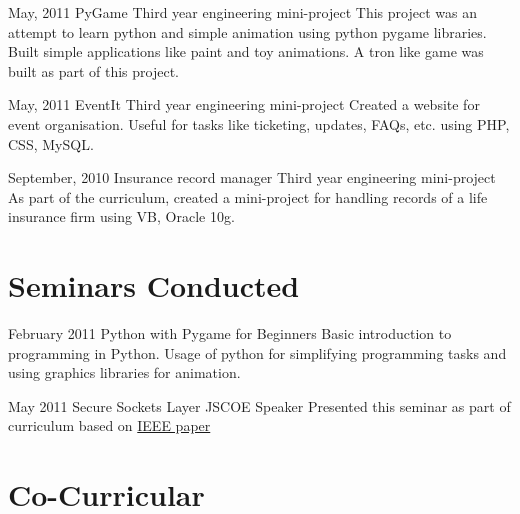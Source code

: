 \documentclass[11pt,a4paper]{moderncv}
\begin{document}
\cventry
{May, 2011}
{PyGame}
{Third year engineering mini-project}
{}
{}
{This project was an attempt to learn python and simple animation using python pygame libraries. Built simple applications like paint and toy 
animations. A tron like game was built as part of this project. }

\cventry
{May, 2011}
{EventIt}
{Third year engineering mini-project}
{}
{}
{Created a website for event organisation. Useful for tasks like ticketing, updates, FAQs, etc. using PHP, CSS, MySQL. }

\cventry
{September, 2010}
{Insurance record manager}
{Third year engineering mini-project}
{}
{}
{As part of the curriculum, created a mini-project for handling records of a life insurance firm using VB, Oracle 10g. }


\section{Seminars Conducted}




\cventry
{February 2011}
{Python with Pygame for Beginners}
{}
{}
{}
{Basic introduction to programming in Python. Usage of python for simplifying programming tasks and using graphics libraries for animation.}

\cventry
{May 2011}
{Secure Sockets Layer}
{JSCOE}
{Speaker}
{}
{Presented this seminar as part of curriculum based on \hyperlink{http://ieeexplore.ieee.org/search/freesrchabstract.jsp?tp=&arnumber=1621007}{IEEE 
paper}}



\section{Co-Curricular}
\end{document}
